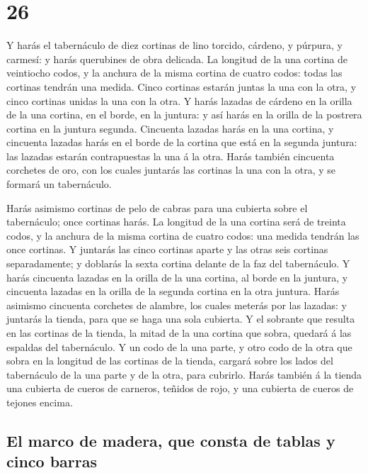\hypertarget{section-25}{%
\section{26}\label{section-25}}

 Y harás el tabernáculo de diez cortinas de lino torcido,
cárdeno, y púrpura, y carmesí: y harás querubines de obra delicada.
 La longitud de la una cortina de veintiocho codos, y la
anchura de la misma cortina de cuatro codos: todas las cortinas tendrán
una medida.  Cinco cortinas estarán juntas la una con la
otra, y cinco cortinas unidas la una con la otra.  Y harás
lazadas de cárdeno en la orilla de la una cortina, en el borde, en la
juntura: y así harás en la orilla de la postrera cortina en la juntura
segunda.  Cincuenta lazadas harás en la una cortina, y
cincuenta lazadas harás en el borde de la cortina que está en la segunda
juntura: las lazadas estarán contrapuestas la una á la otra.
 Harás también cincuenta corchetes de oro, con los cuales
juntarás las cortinas la una con la otra, y se formará un tabernáculo.

 Harás asimismo cortinas de pelo de cabras para una
cubierta sobre el tabernáculo; once cortinas harás.  La
longitud de la una cortina será de treinta codos, y la anchura de la
misma cortina de cuatro codos: una medida tendrán las once cortinas.
 Y juntarás las cinco cortinas aparte y las otras seis
cortinas separadamente; y doblarás la sexta cortina delante de la faz
del tabernáculo.  Y harás cincuenta lazadas en la orilla
de la una cortina, al borde en la juntura, y cincuenta lazadas en la
orilla de la segunda cortina en la otra juntura.  Harás
asimismo cincuenta corchetes de alambre, los cuales meterás por las
lazadas: y juntarás la tienda, para que se haga una sola cubierta.
 Y el sobrante que resulta en las cortinas de la tienda,
la mitad de la una cortina que sobra, quedará á las espaldas del
tabernáculo.  Y un codo de la una parte, y otro codo de
la otra que sobra en la longitud de las cortinas de la tienda, cargará
sobre los lados del tabernáculo de la una parte y de la otra, para
cubrirlo.  Harás también á la tienda una cubierta de
cueros de carneros, teñidos de rojo, y una cubierta de cueros de tejones
encima.

\hypertarget{el-marco-de-madera-que-consta-de-tablas-y-cinco-barras}{%
\subsection{El marco de madera, que consta de tablas y cinco
barras}\label{el-marco-de-madera-que-consta-de-tablas-y-cinco-barras}}

